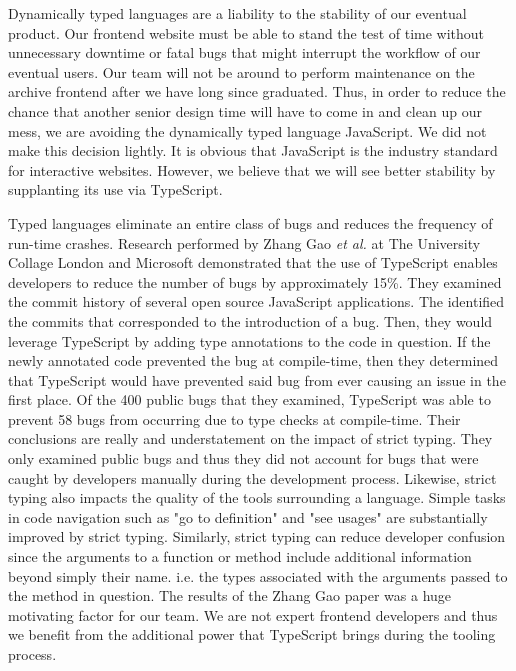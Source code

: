 \documentclass[12pt]{report}
\begin{document}
Dynamically typed languages are a liability to the stability of our eventual product. Our frontend website must be able to stand the test of time without unnecessary downtime or fatal bugs that might interrupt the workflow of our eventual users. Our team will not be around to perform maintenance on the archive frontend after we have long since graduated. Thus, in order to reduce the chance that another senior design time will have to come in and clean up our mess, we are avoiding the dynamically typed language JavaScript. We did not make this decision lightly. It is obvious that JavaScript is the industry standard for interactive websites. However, we believe that we will see better stability by supplanting its use via TypeScript.

Typed languages eliminate an entire class of bugs and reduces the frequency of run-time crashes. Research performed by Zhang Gao \textit{et al.} at The University Collage London and Microsoft demonstrated that the use of TypeScript enables developers to reduce the number of bugs by approximately 15\%.\cite{typescriptpaper} They examined the commit history of several open source JavaScript applications. The identified the commits that corresponded to the introduction of a bug. Then, they would leverage TypeScript by adding type annotations to the code in question. If the newly annotated code prevented the bug at compile-time, then they determined that TypeScript would have prevented said bug from ever causing an issue in the first place. Of the 400 public bugs that they examined, TypeScript was able to prevent 58 bugs from occurring due to type checks at compile-time. Their conclusions are really and understatement on the impact of strict typing. They only examined public bugs and thus they did not account for bugs that were caught by developers manually during the development process. Likewise, strict typing also impacts the quality of the tools surrounding a language. Simple tasks in code navigation such as "go to definition" and "see usages" are substantially improved by strict typing. Similarly, strict typing can reduce developer confusion since the arguments to a function or method include additional information beyond simply their name. i.e. the types associated with the arguments passed to the method in question. The results of the Zhang Gao paper was a huge motivating factor for our team. We are not expert frontend developers and thus we benefit from the additional power that TypeScript brings during the tooling process.

\printbibliography[title={References}]
\end{document}
